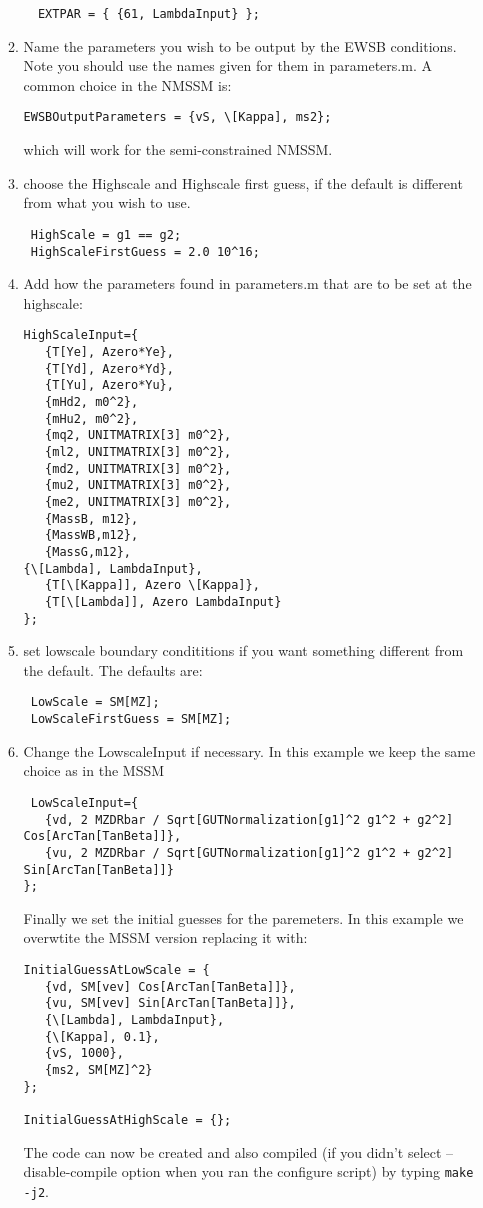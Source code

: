 \documentclass[final,3p,11pt,pdflatex]{elsarticle}
\newcommand{\code}[1]{\lstinline|#1|}  %
\begin{document}
\begin{enumerate}
\begin{enumerate}
\begin{lstlisting}
  EXTPAR = { {61, LambdaInput} };
      \end{lstlisting}
    \item Name the parameters you wish to be output by the EWSB conditions.  Note you should use the names given for them in parameters.m.    A common choice in the NMSSM is:
\begin{lstlisting}
EWSBOutputParameters = {vS, \[Kappa], ms2};
\end{lstlisting}
which will work for the semi-constrained NMSSM.
\item choose the Highscale and Highscale first guess, if the default is different from what you wish to use.  
\begin{lstlisting} 
 HighScale = g1 == g2;
 HighScaleFirstGuess = 2.0 10^16;
\end{lstlisting}
\item Add how the parameters found in parameters.m that are to be set at the highscale:
\begin{lstlisting} 
HighScaleInput={
   {T[Ye], Azero*Ye},
   {T[Yd], Azero*Yd},
   {T[Yu], Azero*Yu},
   {mHd2, m0^2},
   {mHu2, m0^2},
   {mq2, UNITMATRIX[3] m0^2},
   {ml2, UNITMATRIX[3] m0^2},
   {md2, UNITMATRIX[3] m0^2},
   {mu2, UNITMATRIX[3] m0^2},
   {me2, UNITMATRIX[3] m0^2},
   {MassB, m12},
   {MassWB,m12},
   {MassG,m12},
{\[Lambda], LambdaInput},
   {T[\[Kappa]], Azero \[Kappa]},
   {T[\[Lambda]], Azero LambdaInput}
};
\end{lstlisting}
\item set lowscale boundary condititions if you want something different from the default.  The defaults are:
\begin{lstlisting} 
 LowScale = SM[MZ];
 LowScaleFirstGuess = SM[MZ];
\end{lstlisting}
\item Change the LowscaleInput if necessary.  In this example we keep the same choice as in the MSSM
  \begin{lstlisting} 
 LowScaleInput={
   {vd, 2 MZDRbar / Sqrt[GUTNormalization[g1]^2 g1^2 + g2^2] Cos[ArcTan[TanBeta]]},
   {vu, 2 MZDRbar / Sqrt[GUTNormalization[g1]^2 g1^2 + g2^2] Sin[ArcTan[TanBeta]]}
};
  \end{lstlisting}

Finally we set the initial guesses for the paremeters.  In this example we overwtite the MSSM version replacing it with:
 \begin{lstlisting} 
InitialGuessAtLowScale = {
   {vd, SM[vev] Cos[ArcTan[TanBeta]]},
   {vu, SM[vev] Sin[ArcTan[TanBeta]]},
   {\[Lambda], LambdaInput},
   {\[Kappa], 0.1},
   {vS, 1000},
   {ms2, SM[MZ]^2}
};

InitialGuessAtHighScale = {};
 \end{lstlisting}

The code can now be created and also compiled (if you didn't select --disable-compile option when you ran the configure script) by typing \code{make -j2}.


 \end{enumerate}   

\end{enumerate}   
\end{document}
